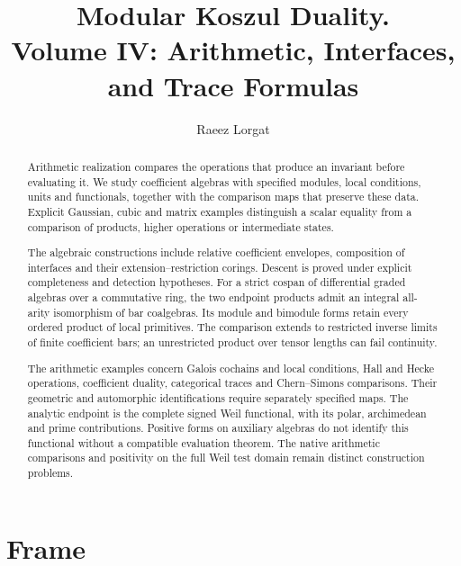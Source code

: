 \documentclass[11pt]{memoir}
\title{\texorpdfstring{Modular Koszul Duality. \\ Volume IV: Arithmetic, Interfaces, and Trace Formulas}{Modular Koszul Duality. Volume IV: Arithmetic, Interfaces, and Trace Formulas}}
\author{Raeez Lorgat}
\date{}
\begin{document}
\frontmatter
\maketitle

\begin{abstract}
Arithmetic realization compares the operations that produce an invariant
before evaluating it. We study coefficient algebras with specified
modules, local conditions, units and functionals, together with the
comparison maps that preserve these data. Explicit Gaussian, cubic and
matrix examples distinguish a scalar equality from a comparison of
products, higher operations or intermediate states.

The algebraic constructions include relative coefficient envelopes,
composition of interfaces and their extension--restriction corings.
Descent is proved under explicit completeness and detection hypotheses.
For a strict cospan of differential graded algebras over a commutative
ring, the two endpoint products admit an integral all-arity isomorphism
of bar coalgebras. Its module and bimodule forms retain every ordered
product of local primitives. The comparison extends to restricted
inverse limits of finite coefficient bars; an unrestricted product over
tensor lengths can fail continuity.

The arithmetic examples concern Galois cochains and local conditions,
Hall and Hecke operations, coefficient duality, categorical traces and
Chern--Simons comparisons. Their geometric and automorphic
identifications require separately specified maps. The analytic endpoint
is the complete signed Weil functional, with its polar, archimedean and
prime contributions. Positive forms on auxiliary algebras do not identify
this functional without a compatible evaluation theorem. The native
arithmetic comparisons and positivity on the full Weil test domain
remain distinct construction problems.
\end{abstract}

\tableofcontents

\mainmatter

\part*{Frame}


\end{document}

